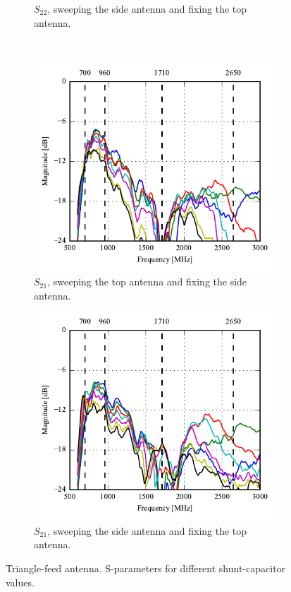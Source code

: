 \begin{figure}[htbp]
\begin{subfigure}{0.49\linewidth}
        \caption{$S_{22}$, sweeping the side antenna and fixing the top antenna.}
    \end{subfigure}
    \\
    \begin{subfigure}{0.49\linewidth}
        \centering
        \includegraphics{img/tech_sol/trianglefeed/mockup/sweep_s21_csh1.pdf}
        \caption{$S_{21}$, sweeping the top antenna and fixing the side antenna.}
    \end{subfigure}
    \hfill
    \begin{subfigure}{0.49\linewidth}
        \centering
        \includegraphics{img/tech_sol/trianglefeed/mockup/sweep_s21_csh2.pdf}
        \caption{$S_{21}$, sweeping the side antenna and fixing the top antenna.}
    \end{subfigure}
    \caption{Triangle-feed antenna. S-parameters for different shunt-capacitor values.}
    \label{fig:triang_proto_sweep_sparams}
\end{figure}

